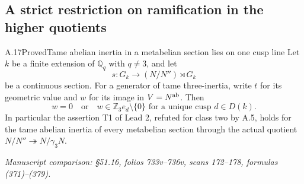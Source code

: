 \subsection{A strict restriction on ramification in the higher quotients}

\begin{statement}{A.17}{Proved}{Tame abelian inertia in a metabelian section lies on one cusp line}
Let $k$ be a finite extension of $\mathbb Q_q$ with $q\ne3$,
and let
\[
 s:G_k\longrightarrow(N/N'')\rtimes G_k
\]
be a continuous section. For a generator of tame three-inertia,
write $t$ for its geometric value and $w$ for its image in
$V=N^{\rm ab}$. Then
\[
 w=0\quad\text{or}\quad
 w\in\mathbb Z_3 e_d\setminus\{0\}
       \text{ for a unique cusp }d\in D(k).
 \tag{A.17.1}
\]
In particular the assertion T1 of Lead 2, refuted for class
two by A.5, holds for the tame abelian inertia of every
metabelian section through the actual quotient
$N/N''\twoheadrightarrow N/\gamma_3N$.
\par\smallskip\noindent\emph{Manuscript comparison: \S51.16,
folios 733v--736v, scans 172--178, formulas (371)--(379).}
\end{statement}
